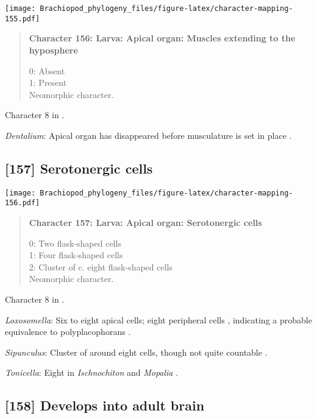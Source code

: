 \documentclass[openany]{book}
\theoremstyle{definition}
\theoremstyle{definition}
\theoremstyle{definition}
\theoremstyle{remark}
\begin{document}
\texttt{[image: Brachiopod\_phylogeny\_files/figure-latex/character-mapping-155.pdf]}

\begin{quote}
\textbf{Character 156: Larva: Apical organ: Muscles extending to the
hyposphere}

0: Absent\\
1: Present\\
Neomorphic character.
\end{quote}

Character 8 in \citet{Vinther2008}.

\hypertarget{Dentalium-coding-156}{}
\emph{Dentalium}: Apical organ has disappeared before musculature is set
in place \citep{Wanninger2002M}.

\subsection*{{[}157{]} Serotonergic cells}\label{serotonergic-cells}

\texttt{[image: Brachiopod\_phylogeny\_files/figure-latex/character-mapping-156.pdf]}

\begin{quote}
\textbf{Character 157: Larva: Apical organ: Serotonergic cells}

0: Two flask-shaped cells\\
1: Four flask-shaped cells\\
2: Cluster of c. eight flask-shaped cells\\
Neomorphic character.
\end{quote}

Character 8 in \citet{Haszprunar2008}.

\hypertarget{Loxosomella-coding-157}{}
\emph{Loxosomella}: Six to eight apical cells; eight peripheral cells
\citep{Wanninger2007}, indicating a probable equivalence to
polyplacophorans \citep{Haszprunar2008}.

\hypertarget{Sipunculus-coding-157}{}
\emph{Sipunculus}: Cluster of around eight cells, though not quite
countable \citep{Wanninger2005}.

\hypertarget{Tonicella-coding-157}{}
\emph{Tonicella}: Eight in \emph{Ischnochiton} and \emph{Mopalia}
\citep{Wanninger2007}.

\subsection*{{[}158{]} Develops into adult
brain}\label{develops-into-adult-brain}
\end{document}
